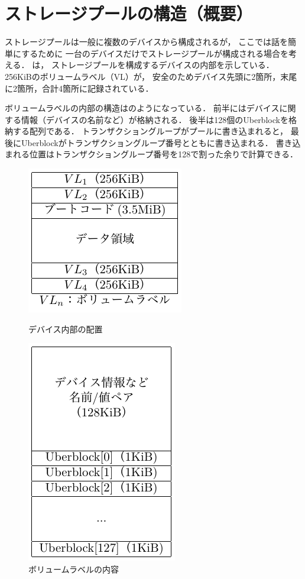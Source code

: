 \section{ストレージプールの構造（概要）}
ストレージプールは一般に複数のデバイスから構成されるが，
ここでは話を簡単にするために
一台のデバイスだけでストレージプールが構成される場合を考える．
は，
ストレージプールを構成するデバイスの内部を示している．
256KiBのボリュームラベル（VL）が，
安全のためデバイス先頭に2箇所，末尾に2箇所，合計4箇所に記録されている．

ボリュームラベルの内部の構造はのようになっている．
前半にはデバイスに関する情報（デバイスの名前など）が格納される．
後半は128個のUberblockを格納する配列である．
トランザクショングループがプールに書き込まれると，
最後にUberblockがトランザクショングループ番号とともに書き込まれる．
書き込まれる位置はトランザクショングループ番号を128で割った余りで計算できる．

\begin{figure}[btp]
  \centering
  \begin{minipage}{0.4\columnwidth}
    \centering\includegraphics[scale=1.0]{Fig/zfsDevice.pdf}
    \caption{デバイス内部の配置}
    \label{fig:zfsDevice}
  \end{minipage}
  \begin{minipage}{0.4\columnwidth}
    \centering\includegraphics[scale=1.0]{Fig/zfsVolumeLabel.pdf}
    \caption{ボリュームラベルの内容}
    \label{fig:zfsVolumeLabel}
  \end{minipage}
\end{figure}

